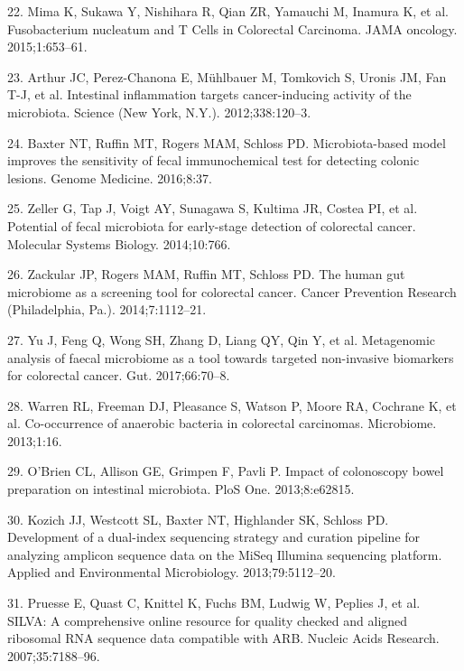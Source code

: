 \documentclass[12pt,]{article}
\begin{document}
\hypertarget{ref-mima_fusobacterium_2015}{}
22. Mima K, Sukawa Y, Nishihara R, Qian ZR, Yamauchi M, Inamura K, et
al. Fusobacterium nucleatum and T Cells in Colorectal Carcinoma. JAMA
oncology. 2015;1:653--61.

\hypertarget{ref-arthur_intestinal_2012}{}
23. Arthur JC, Perez-Chanona E, Mühlbauer M, Tomkovich S, Uronis JM, Fan
T-J, et al. Intestinal inflammation targets cancer-inducing activity of
the microbiota. Science (New York, N.Y.). 2012;338:120--3.

\hypertarget{ref-baxter_microbiota-based_2016}{}
24. Baxter NT, Ruffin MT, Rogers MAM, Schloss PD. Microbiota-based model
improves the sensitivity of fecal immunochemical test for detecting
colonic lesions. Genome Medicine. 2016;8:37.

\hypertarget{ref-zeller_potential_2014}{}
25. Zeller G, Tap J, Voigt AY, Sunagawa S, Kultima JR, Costea PI, et al.
Potential of fecal microbiota for early-stage detection of colorectal
cancer. Molecular Systems Biology. 2014;10:766.

\hypertarget{ref-zackular_human_2014}{}
26. Zackular JP, Rogers MAM, Ruffin MT, Schloss PD. The human gut
microbiome as a screening tool for colorectal cancer. Cancer Prevention
Research (Philadelphia, Pa.). 2014;7:1112--21.

\hypertarget{ref-yu_metagenomic_2017}{}
27. Yu J, Feng Q, Wong SH, Zhang D, Liang QY, Qin Y, et al. Metagenomic
analysis of faecal microbiome as a tool towards targeted non-invasive
biomarkers for colorectal cancer. Gut. 2017;66:70--8.

\hypertarget{ref-warren_co-occurrence_2013}{}
28. Warren RL, Freeman DJ, Pleasance S, Watson P, Moore RA, Cochrane K,
et al. Co-occurrence of anaerobic bacteria in colorectal carcinomas.
Microbiome. 2013;1:16.

\hypertarget{ref-obrien_impact_2013}{}
29. O'Brien CL, Allison GE, Grimpen F, Pavli P. Impact of colonoscopy
bowel preparation on intestinal microbiota. PloS One. 2013;8:e62815.

\hypertarget{ref-kozich_development_2013}{}
30. Kozich JJ, Westcott SL, Baxter NT, Highlander SK, Schloss PD.
Development of a dual-index sequencing strategy and curation pipeline
for analyzing amplicon sequence data on the MiSeq Illumina sequencing
platform. Applied and Environmental Microbiology. 2013;79:5112--20.

\hypertarget{ref-pruesse_silva_2007}{}
31. Pruesse E, Quast C, Knittel K, Fuchs BM, Ludwig W, Peplies J, et al.
SILVA: A comprehensive online resource for quality checked and aligned
ribosomal RNA sequence data compatible with ARB. Nucleic Acids Research.
2007;35:7188--96.
\end{document}
